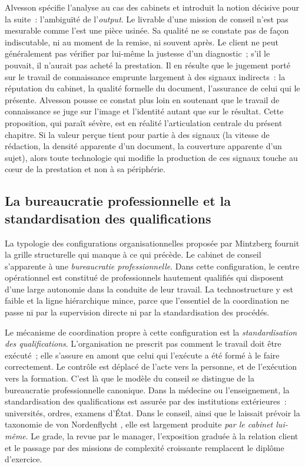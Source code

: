 Alvesson \cite{alvesson2004} spécifie l'analyse au cas des cabinets et introduit la notion
décisive pour la suite~: l'ambiguïté de l'\textit{output}. Le livrable d'une mission de
conseil n'est pas mesurable comme l'est une pièce usinée. Sa qualité ne se constate pas de
façon indiscutable, ni au moment de la remise, ni souvent après. Le client ne peut
généralement pas vérifier par lui-même la justesse d'un diagnostic~; s'il le pouvait, il
n'aurait pas acheté la prestation. Il en résulte que le jugement porté sur le travail de
connaissance emprunte largement à des signaux indirects~: la réputation du cabinet, la
qualité formelle du document, l'assurance de celui qui le présente. \mbox{Alvesson}
\cite{alvesson2001} pousse ce constat plus loin en soutenant que le travail de connaissance
se juge sur l'image et l'identité autant que sur le résultat. Cette proposition, qui paraît
sévère, est en réalité l'articulation centrale du présent chapitre. Si la valeur perçue
tient pour partie à des signaux (la vitesse de rédaction, la densité apparente d'un
document, la couverture apparente d'un sujet), alors toute technologie qui modifie la
production de ces signaux touche au c{\oe}ur de la prestation et non à sa périphérie.

\subsection{La bureaucratie professionnelle et la standardisation des qualifications}

La typologie des configurations organisationnelles proposée par Mintzberg
\cite{mintzberg1982} fournit la grille structurelle qui manque à ce qui précède. Le cabinet
de conseil s'apparente à une \textit{bureaucratie professionnelle}. Dans cette
configuration, le centre opérationnel est constitué de professionnels hautement qualifiés
qui disposent d'une large autonomie dans la conduite de leur travail. La technostructure y
est faible et la ligne hiérarchique mince, parce que l'essentiel de la coordination ne
passe ni par la supervision directe ni par la standardisation des procédés.

Le mécanisme de coordination propre à cette configuration est la \textit{standardisation des
qualifications}. L'organisation ne prescrit pas comment le travail doit être exécuté~; elle
s'assure en amont que celui qui l'exécute a été formé à le faire correctement. Le contrôle
est déplacé de l'acte vers la personne, et de l'exécution vers la formation. C'est là que le
modèle du conseil se distingue de la bureaucratie professionnelle canonique. Dans la
médecine ou l'enseignement, la standardisation des qualifications est assurée par des
institutions extérieures~: universités, ordres, examens d'État. Dans le conseil, ainsi que
le laissait prévoir la taxonomie de von Nordenflycht \cite{nordenflycht2010}, elle est
largement produite \textit{par le cabinet lui-même}. Le grade, la revue par le manager,
l'exposition graduée à la relation client et le passage par des missions de complexité
croissante remplacent le diplôme d'exercice.

